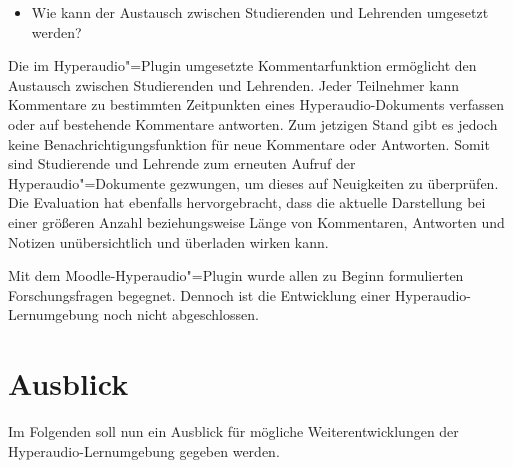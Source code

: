 \begin{itemize}
\item Wie kann der Austausch zwischen Studierenden und Lehrenden umgesetzt werden?
\end{itemize}
Die im Hyperaudio"=Plugin umgesetzte Kommentarfunktion ermöglicht den Austausch zwischen Studierenden und Lehrenden. Jeder Teilnehmer kann Kommentare zu bestimmten Zeitpunkten eines Hyperaudio-Dokuments verfassen oder auf bestehende Kommentare antworten. Zum jetzigen Stand gibt es jedoch keine Benachrichtigungsfunktion für neue Kommentare oder Antworten. Somit sind Studierende und Lehrende zum erneuten Aufruf der Hyperaudio"=Dokumente gezwungen, um dieses auf Neuigkeiten zu überprüfen. Die Evaluation hat ebenfalls hervorgebracht, dass die aktuelle Darstellung bei einer größeren Anzahl beziehungsweise Länge von Kommentaren, Antworten und Notizen unübersichtlich und überladen wirken kann.

Mit dem Moodle-Hyperaudio"=Plugin wurde allen zu Beginn formulierten Forschungsfragen begegnet. Dennoch ist die Entwicklung einer Hyperaudio-Lernumgebung noch nicht abgeschlossen.
%

\section{Ausblick}

Im Folgenden soll nun ein Ausblick für mögliche Weiterentwicklungen der Hyperaudio-Lernumgebung gegeben werden.


